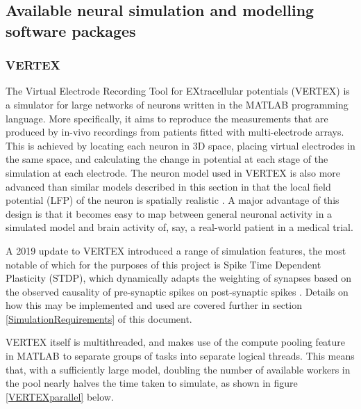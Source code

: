 \subsection{Available neural simulation and modelling software packages}

\subsubsection{VERTEX}
The Virtual Electrode Recording Tool for EXtracellular potentials (VERTEX) is a
simulator for large networks of neurons written in the MATLAB programming
language. More specifically, it aims to reproduce the measurements that are
produced by in-vivo recordings from patients fitted with multi-electrode
arrays. This is achieved by locating each neuron in 3D space, placing virtual
electrodes in the same space, and calculating the change in potential at each
stage of the simulation at each electrode. The neuron model used in VERTEX is
also more advanced than similar models described in this section in that the
local field potential (LFP) of the neuron is spatially realistic
\autocite{tomsett_virtual_2015}. A major advantage of this design is that it
becomes easy to map between general neuronal activity in a simulated model and
brain activity of, say, a real-world patient in a medical trial.

A 2019 update to VERTEX introduced a range of simulation features, the most
notable of which for the purposes of this project is Spike Time Dependent
Plasticity (STDP), which dynamically adapts the weighting of synapses based on
the observed causality of pre-synaptic spikes on post-synaptic spikes
\autocite{thornton_virtual_2019}. Details on how this may be implemented and
used are covered further in section \ref{SimulationRequirements} of this document.

VERTEX itself is multithreaded, and makes use of the compute pooling feature in
MATLAB to separate groups of tasks into separate logical threads. This means
that, with a sufficiently large model, doubling the number of available workers
in the pool nearly halves the time taken to simulate, as shown in figure
\ref{VERTEXparallel} below.

